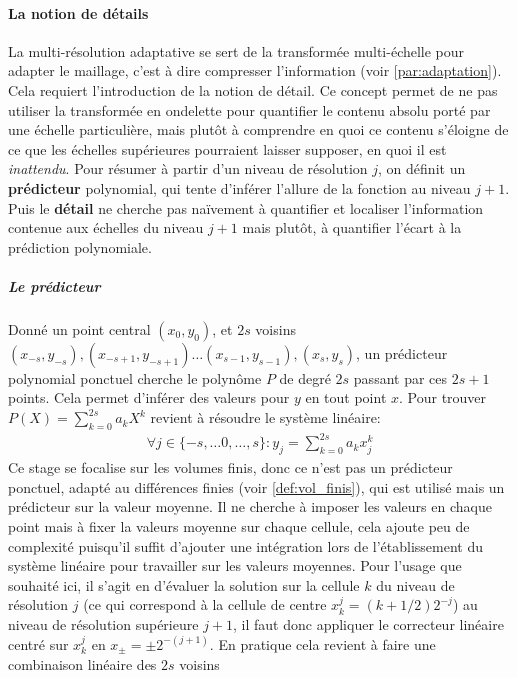     \paragraph{La notion de détails}
        La multi-résolution adaptative se sert de la transformée multi-échelle pour adapter le maillage, c'est à dire compresser l'information (voir \ref{par:adaptation}).
        Cela requiert l'introduction de la notion de détail. Ce concept permet de ne pas utiliser la transformée en ondelette pour quantifier le contenu absolu porté par une échelle particulière,
        mais plutôt à comprendre en quoi ce contenu s'éloigne de ce que les échelles supérieures pourraient laisser supposer, en quoi il est \textit{inattendu}.
        Pour résumer à partir d'un niveau de résolution $j$, on définit un \textbf{prédicteur} polynomial, qui tente d'inférer l'allure de la fonction au niveau $j+1$.
        Puis le \textbf{détail} ne cherche pas naïvement à quantifier et localiser l'information contenue aux échelles du niveau $j+1$ mais plutôt, 
        à quantifier l'écart à la prédiction polynomiale.
        \subparagraph{Le prédicteur}
            Donné un point central $(x_0,y_0)$, et $2s$ voisins $(x_{-s},y_{-s}),(x_{-s+1},y_{-s+1})\dots (x_{s-1},y_{s-1}),(x_s,y_s)$, un prédicteur polynomial 
            ponctuel cherche le polynôme $P$ de degré $2s$ passant par ces $2s+1$ points. Cela permet d'inférer des valeurs pour $y$ en tout point $x$.
            Pour trouver $P(X) = \sum_{k=0}^{2s} a_k X^k$ revient à résoudre le système linéaire:
            \begin{align}
                \forall j \in \{-s,\dots 0 ,\dots,s\}: y_j = \sum_{k=0}^{2s} a_k x_j^k
            \end{align}
            Ce stage se focalise sur les volumes finis, donc ce n'est pas un prédicteur ponctuel, adapté au différences finies (voir \ref{def:vol_finis}), qui est utilisé mais un prédicteur sur la valeur moyenne. 
            Il ne cherche à imposer les valeurs en chaque point mais à fixer la valeurs moyenne sur chaque cellule,
            cela ajoute peu de complexité puisqu'il suffit d'ajouter une intégration lors de l'établissement du système linéaire pour travailler sur les valeurs moyennes.
            Pour l'usage que souhaité ici, il s'agit en d'évaluer la solution sur la cellule $k$ du niveau de résolution $j$ 
            (ce qui correspond à la cellule de centre $x_k^j = (k+1/2) 2^{-j}$) au niveau de résolution supérieure $j+1$,
            il faut donc appliquer le correcteur linéaire centré sur $x_k^j$ en $x_{\pm} = \pm 2^{-(j+1)}$. En pratique cela revient à faire une combinaison linéaire des $2s$ voisins

